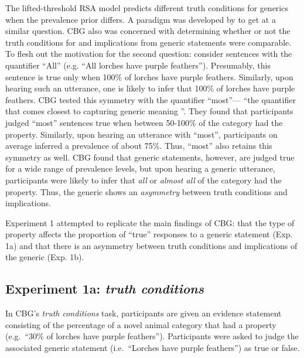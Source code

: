 \documentclass[10pt,letterpaper]{article}
\begin{document}
The lifted-threshold RSA model predicts different truth conditions for generics when the prevalence prior differs. A paradigm was developed by  to get at a similar question. CBG also was concerned with determining whether or not the truth conditions for and implications from generic statements were comparable. To flesh out the motivation for the second question: consider sentences with the quantifier ``All'' (e.g. ``All lorches have purple feathers''). Presumably, this sentence is true only when 100\% of lorches have purple feathers. Similarly, upon hearing such an utterance, one is likely to infer that 100\% of lorches have purple feathers. CBG tested this symmetry with the quantifier ``most''--- ``the quantifier that comes closest to capturing generic meaning \cite{Carlson1977,Cimpian2010b}''. They found that participants judged ``most'' sentences true when between 50-100\% of the category had the property. Similarly, upon hearing an utterance with ``most'', participants on average inferred a prevalence of about 75\%. Thus, ``most'' also retains this symmetry as well. CBG found that generic statements, however, are judged true for a wide range of prevalence levels, but upon hearing a generic utterance, participants were likely to infer that \emph{all} or \emph{almost all} of the category had the property. Thus, the generic shows an \emph{asymmetry} between truth conditions and implications.



Experiment 1 attempted to replicate the main findings of CBG: that the type of property affects the proportion of ``true'' responses to a generic statement (Exp. 1a) and that there is an asymmetry between truth conditions and implications of the generic (Exp. 1b). 

\subsection{Experiment 1a: \emph{truth conditions}}

In CBG's \emph{truth conditions} task, participants are given an evidence statement consisting of the percentage of a novel animal category that had a property (e.g.~``30\% of lorches have purple feathers''). Participants were asked to judge the associated generic statement (i.e.~``Lorches have purple feathers'') as true or false. 
\end{document}
